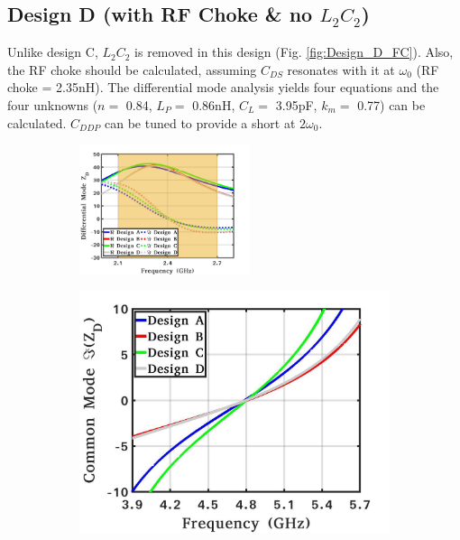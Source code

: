 \documentclass[conference]{IEEEtran}
\begin{document}
\subsection{Design D (with RF Choke \& no $L_2C_2$)}
 Unlike design C, $L_2C_2$ is removed in this design (Fig. \ref{fig:Design_D_FC}). Also, the RF choke should be calculated, assuming $C_{DS}$ resonates with it at $\omega_0$ (RF choke = 2.35nH).
The differential mode analysis yields four equations and the four unknowns ($n =$ 0.84, $L_P =$ 0.86nH, $C_L =$ 3.95pF, $k_m=$ 0.77) can be calculated.
$C_{DDP}$ can be tuned to provide a short at $2\omega_0$.

\begin{figure}[!t]
	\captionsetup{font=footnotesize}
	\centering
	\begin{subfigure}{0.5\textwidth}
		\centering
		\includegraphics[width=0.55\textwidth]{Images/Output_Network_Comp/Comp_1H.pdf}
		\caption{}
		\label{fig:Comp_1H}
	\end{subfigure}
	\begin{subfigure}{0.24\textwidth}
		\includegraphics[width=1\textwidth]{Images/Output_Network_Comp/Comp_2H_imag.pdf}

\end{subfigure}
\end{figure}
\end{document}
